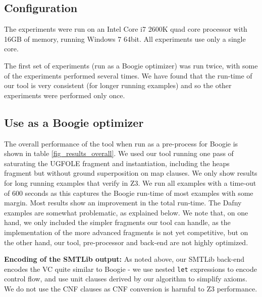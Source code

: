 \subsection*{Configuration}
The experiments were run on an Intel Core i7 2600K quad core processor with 16GB of memory, running Windows 7 64bit.
All experiments use only a single core.

The first set of experiments (run as a Boogie optimizer) was run twice, with some of the experiments performed several times. We have found that the run-time of our tool is very consistent (for longer running examples) and so the other experiments were performed only once.

\subsection*{Use as a Boogie optimizer}
The overall performance of the tool when run as a pre-process for Boogie is shown in table \ref{fig_results_overall}.
We used our tool running one pass of saturating the UGFOLE fragment and instantiation, 
including the heaps fragment but without ground superposition on map clauses.
We only show results for long running examples that verify in Z3. We run all examples with a time-out of 600 seconds as this captures the Boogie run-time of most examples with some margin.
Most results show an improvement in the total run-time. The Dafny examples are somewhat problematic, as explained below. We note that, on one hand, we only included the simpler fragments our tool can handle, as the implementation of the more advanced fragments is not yet competitive, but on the other hand, our tool, pre-processor and back-end are not highly optimized.


\textbf{Encoding of the SMTLib output:}
As noted above, our SMTLib back-end encodes the VC quite similar to Boogie - we use nested \lstinline|let| expressions to encode control flow, and use unit clauses derived by our algorithm to simplify axioms.
We do not use the CNF clauses as CNF conversion is harmful to Z3 performance.


